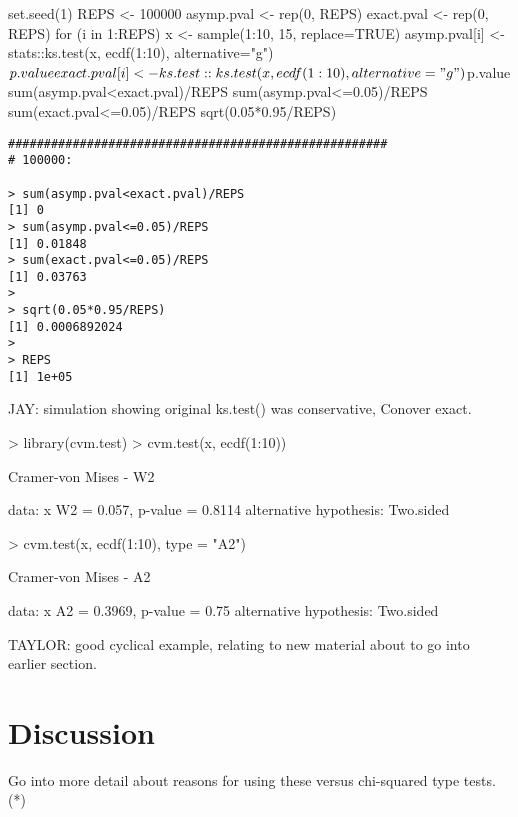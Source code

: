\documentclass[article]{jss}
\begin{document}
\begin{Schunk}
\begin{Sinput}
set.seed(1)
REPS <- 100000
asymp.pval <- rep(0, REPS)
exact.pval <- rep(0, REPS)
for (i in 1:REPS) {
  x <- sample(1:10, 15, replace=TRUE)
  asymp.pval[i] <- stats::ks.test(x, ecdf(1:10), alternative="g")$p.value
  exact.pval[i] <- ks.test::ks.test(x, ecdf(1:10), alternative="g")$p.value
}
sum(asymp.pval<exact.pval)/REPS
sum(asymp.pval<=0.05)/REPS
sum(exact.pval<=0.05)/REPS
sqrt(0.05*0.95/REPS)
\end{Sinput}
\end{Schunk}

\begin{verbatim}
#####################################################
# 100000:

> sum(asymp.pval<exact.pval)/REPS
[1] 0
> sum(asymp.pval<=0.05)/REPS
[1] 0.01848
> sum(exact.pval<=0.05)/REPS
[1] 0.03763
> 
> sqrt(0.05*0.95/REPS)
[1] 0.0006892024
> 
> REPS
[1] 1e+05
\end{verbatim}

JAY: simulation showing original ks.test() was conservative, Conover exact.

\begin{Schunk}
\begin{Sinput}
> library(cvm.test)
> cvm.test(x, ecdf(1:10))
\end{Sinput}
\begin{Soutput}
	Cramer-von Mises - W2

data:  x 
W2 = 0.057, p-value = 0.8114
alternative hypothesis: Two.sided 
\end{Soutput}
\begin{Sinput}
> cvm.test(x, ecdf(1:10), type = "A2")
\end{Sinput}
\begin{Soutput}
	Cramer-von Mises - A2

data:  x 
A2 = 0.3969, p-value = 0.75
alternative hypothesis: Two.sided 
\end{Soutput}
\end{Schunk}

TAYLOR: good cyclical example, relating to new material about to go into
earlier section.


\section{Discussion}

Go into more detail about reasons for using these versus chi-squared type tests. (*) 
\end{document}

